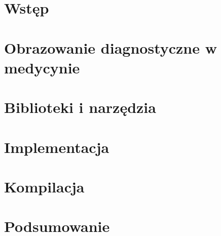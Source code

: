 \chapter{Wstęp}


\chapter{Obrazowanie diagnostyczne w medycynie}


\chapter{Biblioteki i narzędzia}


\chapter{Implementacja}


\chapter{Kompilacja}


\chapter{Podsumowanie}

